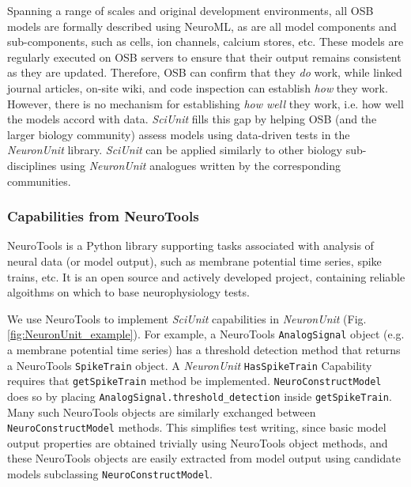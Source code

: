 \documentclass[11pt,letterpaper]{article}
\let\verbx\lstinline
\begin{document}
Spanning a range of scales and original development environments, all OSB models are formally described using NeuroML, as are all model components and sub-components, such as cells, ion channels, calcium stores, etc.  These models are regularly executed on OSB servers to ensure that their output remains consistent as they are updated.  Therefore, OSB can confirm that they \textit{do} work, while linked journal articles, on-site wiki, and code inspection can establish \textit{how} they work. However, there is no mechanism for establishing \textit{how well} they work, i.e. how well the models accord with data.  \textit{SciUnit} fills this gap by helping OSB (and the larger biology community) assess models using data-driven tests in the \textit{NeuronUnit} library.  \textit{SciUnit} can be applied similarly to other biology sub-disciplines using \textit{NeuronUnit} analogues written by the corresponding communities.    

\subsubsection{Capabilities from NeuroTools}
NeuroTools\cite{neuralensemble_url} is a Python library supporting tasks associated with analysis of neural data (or model output), such as membrane potential time series, spike trains, etc. It is an open source and actively developed project, containing reliable algoithms on which to base neurophysiology tests.

We use NeuroTools to implement \textit{SciUnit} capabilities in \textit{NeuronUnit} (Fig. \ref{fig:NeuronUnit_example}).  For example, a NeuroTools \verbx{AnalogSignal} object (e.g. a membrane potential time series) has a threshold detection method that returns a NeuroTools \verbx{SpikeTrain} object.  A \textit{NeuronUnit} \verbx{HasSpikeTrain} Capability requires that  \verbx{getSpikeTrain} method be implemented.  \verbx{NeuroConstructModel} does so by placing \verbx{AnalogSignal.threshold_detection} inside \verbx{getSpikeTrain}.  Many such NeuroTools objects are similarly exchanged between \verbx{NeuroConstructModel} methods.  This simplifies test writing, since basic model output properties are obtained trivially using NeuroTools object methods, and these NeuroTools objects are easily extracted from model output using candidate models subclassing \verbx{NeuroConstructModel}.  
\end{document}
